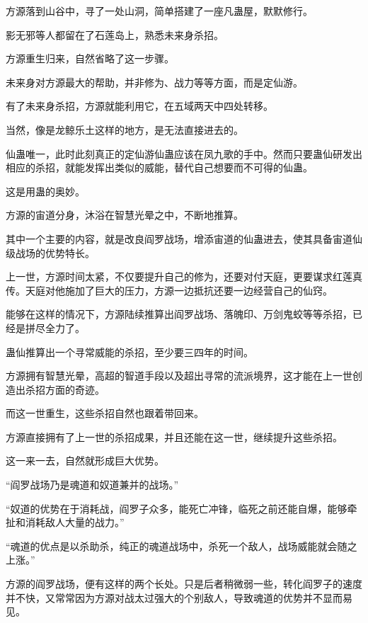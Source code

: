 
\begin{this_body}



方源落到山谷中，寻了一处山洞，简单搭建了一座凡蛊屋，默默修行。

影无邪等人都留在了石莲岛上，熟悉未来身杀招。

方源重生归来，自然省略了这一步骤。

未来身对方源最大的帮助，并非修为、战力等等方面，而是定仙游。

有了未来身杀招，方源就能利用它，在五域两天中四处转移。

当然，像是龙鲸乐土这样的地方，是无法直接进去的。

仙蛊唯一，此时此刻真正的定仙游仙蛊应该在凤九歌的手中。然而只要蛊仙研发出相应的杀招，就能发挥出类似的威能，替代自己想要而不可得的仙蛊。

这是用蛊的奥妙。

方源的宙道分身，沐浴在智慧光晕之中，不断地推算。

其中一个主要的内容，就是改良阎罗战场，增添宙道的仙蛊进去，使其具备宙道仙级战场的优势特长。

上一世，方源时间太紧，不仅要提升自己的修为，还要对付天庭，更要谋求红莲真传。天庭对他施加了巨大的压力，方源一边抵抗还要一边经营自己的仙窍。

能够在这样的情况下，方源陆续推算出阎罗战场、落魄印、万剑鬼蛟等等杀招，已经是拼尽全力了。

蛊仙推算出一个寻常威能的杀招，至少要三四年的时间。

方源拥有智慧光晕，高超的智道手段以及超出寻常的流派境界，这才能在上一世创造出杀招方面的奇迹。

而这一世重生，这些杀招自然也跟着带回来。

方源直接拥有了上一世的杀招成果，并且还能在这一世，继续提升这些杀招。

这一来一去，自然就形成巨大优势。

“阎罗战场乃是魂道和奴道兼并的战场。”

“奴道的优势在于消耗战，阎罗子众多，能死亡冲锋，临死之前还能自爆，能够牵扯和消耗敌人大量的战力。”

“魂道的优点是以杀助杀，纯正的魂道战场中，杀死一个敌人，战场威能就会随之上涨。”

方源的阎罗战场，便有这样的两个长处。只是后者稍微弱一些，转化阎罗子的速度并不快，又常常因为方源对战太过强大的个别敌人，导致魂道的优势并不显而易见。


\end{this_body}
